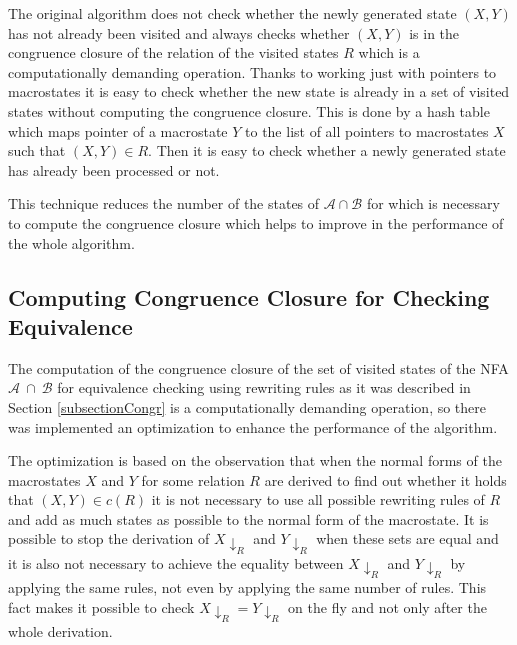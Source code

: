 The original algorithm does not check whether the newly generated state $(X,Y)$ has not already been visited and always checks whether $(X,Y)$ is in
the congruence closure of the relation of the visited states $R$  which is
a computationally demanding operation. Thanks to working just with pointers to macrostates it is easy to check whether the new state is already in a set of 
visited states without computing the congruence closure. This is done by a hash table which maps pointer of a macrostate $Y$ to the list of all
pointers to macrostates $X$ such that $(X,Y)\in R$. Then it is easy to check whether a newly generated state has already been processed or not. 

This technique reduces the number of the states of $\mathcal{A}\cap\mathcal{B}$ for which is necessary to compute the congruence closure which helps to
improve in the performance of the whole algorithm.

\subsection{Computing Congruence Closure for Checking Equivalence}
The computation of the congruence closure of the set of visited states of the NFA $\mathcal{A}~\cap~\mathcal{B}$ for equivalence checking using rewriting
rules as it was described in Section \ref{subsectionCongr} is a computationally demanding operation, 
so there was implemented an optimization to enhance the performance of the algorithm.

The optimization is based on the observation that when the normal forms of the macrostates $X$ and $Y$ for some relation $R$ are derived to find out whether
it holds that $(X,Y)\in c(R)$ it is not necessary to use all possible rewriting rules of $R$ and add as much states as possible to the normal form
of the macrostate. It is possible to stop the derivation of
$X{\downarrow_R}$ and $Y{\downarrow_R}$ when these sets are equal and it is also not necessary to achieve the equality between 
$X{\downarrow_R}$ and $Y{\downarrow_R}$ by applying the same rules, not even by applying the same number of rules. 
This fact makes it possible to check $X{\downarrow_R} = Y{\downarrow_R}$ on the fly and not only after the whole derivation.

